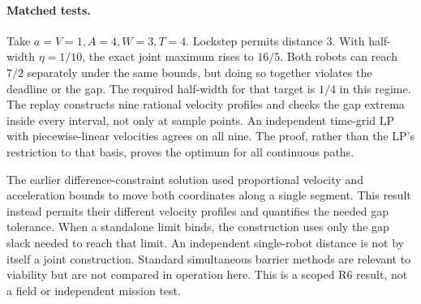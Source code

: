 \documentclass[11pt]{article}
\begin{document}
\paragraph{Matched tests.}
Take \(a=V=1,A=4,W=3,T=4\). Lockstep permits distance \(3\).
With half-width \(\eta=1/10\), the exact joint maximum rises to
\(16/5\). Both robots can reach \(7/2\) separately under the same
bounds, but doing so together violates the deadline or the gap.
The required half-width for that target is \(1/4\) in this regime.
The replay constructs nine rational velocity profiles and checks the
gap extrema inside every interval, not only at sample points.
An independent time-grid LP with piecewise-linear velocities
agrees on all nine. The proof, rather than the LP's restriction to
that basis, proves the optimum for all continuous paths.

The earlier difference-constraint solution used proportional
velocity and acceleration bounds to move both coordinates along a
single segment. This result instead permits their different velocity
profiles and quantifies the needed gap tolerance. When a standalone limit binds, the construction uses only the gap
slack needed to reach that limit. An independent single-robot distance
is not by itself a joint construction. Standard simultaneous
barrier methods are relevant to viability but are not compared
in operation here. This is a scoped R6 result, not a field
or independent mission test.
\end{document}
